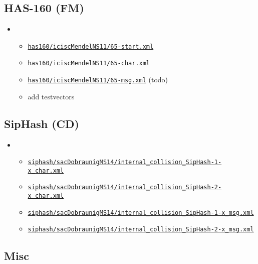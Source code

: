 \documentclass[11pt, a4paper]{article}
\newcommand{\hashlink}[2][black]{\href{https://extgit.iaik.tugraz.at/krypto/nldtool/blob/master/hash/#2}{\color{#1}\nolinkurl{#2}}}
\begin{document}
\begin{itemize}
\subsection{HAS-160 (FM)}

\begin{itemize}
  \item {}
    \begin{itemize}
      \item \hashlink[todo]{has160/iciscMendelNS11/65-start.xml}
      \item \hashlink[todo]{has160/iciscMendelNS11/65-char.xml}
      \item \hashlink[todo]{has160/iciscMendelNS11/65-msg.xml} (todo)
      \item add testvectors
    \end{itemize}
\end{itemize}

\subsection{SipHash (CD)}

\begin{itemize}
  \item {}
    \begin{itemize}
      \item \hashlink[done]{siphash/sacDobraunigMS14/internal_collision_SipHash-1-x_char.xml}
      \item \hashlink[done]{siphash/sacDobraunigMS14/internal_collision_SipHash-2-x_char.xml}
      \item \hashlink[done]{siphash/sacDobraunigMS14/internal_collision_SipHash-1-x_msg.xml}
      \item \hashlink[done]{siphash/sacDobraunigMS14/internal_collision_SipHash-2-x_msg.xml}
    \end{itemize}
\end{itemize}

\subsection{Misc}


\end{itemize}
\end{document}
